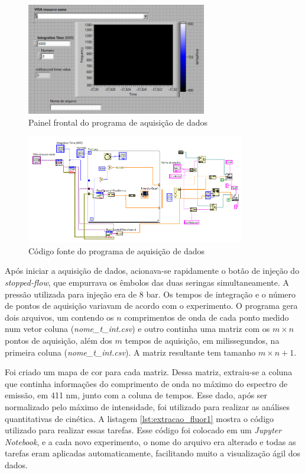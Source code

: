 			\begin{figure}[h]
				\centering
				\includegraphics[width=0.7\textwidth]{imagens/fluor/painel_frontal}
				\caption{Painel frontal do programa de aquisição de dados}
				\label{fig:fluor_painelfrontal}
			\end{figure}
			
			\begin{figure}[h]
				\centering
				\includegraphics[width=0.85\textwidth]{imagens/fluor/gravacao_dados}
				\caption{Código fonte do programa de aquisição de dados}
				\label{fig:fluor_gravacaodados}
			\end{figure}

			Após iniciar a aquisição de dados, acionava-se rapidamente o botão de injeção do \emph{stopped-flow}, que empurrava os êmbolos das duas seringas simultaneamente. A pressão utilizada para injeção era de 8 bar. Os tempos de integração e o número de pontos de aquisição variavam de acordo com o experimento. O programa gera dois arquivos, um contendo os \(n\) comprimentos de onda de cada ponto medido num vetor coluna (\emph{nome\_t\_int.csv}) e outro continha uma matriz com os \(m \times n\) pontos de aquisição, além dos \(m\) tempos de aquisição, em milissegundos, na primeira coluna (\emph{nome\_t\_int.csv}). A matriz resultante tem tamanho \(m\times n+1\).
			
			Foi criado um mapa de cor para cada matriz. Dessa matriz, extraiu-se a coluna que continha informações do comprimento de onda no máximo do espectro de emissão, em 411 nm, junto com a coluna de tempos. Esse dado, após ser normalizado pelo máximo de intensidade, foi utilizado para realizar as análises quantitativas de cinética. A listagem \ref{lst:extracao_fluor1} mostra o código utilizado para realizar essas tarefas. Esse código foi colocado em um \emph{Jupyter Notebook}, e a cada novo experimento, o nome do arquivo era alterado e todas as tarefas eram aplicadas automaticamente, facilitando muito a visualização ágil dos dados.
			
